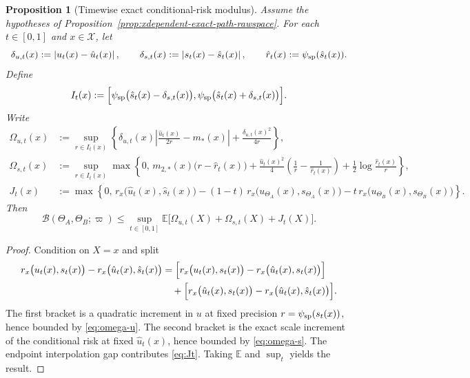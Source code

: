 \documentclass[11pt]{article}
\newtheorem{proposition}[theorem]{Proposition}
\theoremstyle{definition}
\newcommand{\E}{\mathbb{E}}
\newcommand{\abs}[1]{\left\lvert #1 \right\rvert}
\newcommand{\mc}[1]{\mathcal{#1}}
\newcommand{\cB}{\mathcal{B}}
\begin{document}
\begin{proposition}[Timewise exact conditional-risk modulus]
\label{prop:timewise-exact-condrisk-modulus}
Assume the hypotheses of Proposition~\ref{prop:xdependent-exact-path-rawspace}.
For each $t\in[0,1]$ and $x\in\mc{X}$, let
\[
  \delta_{u,t}(x):=\abs{u_t(x)-\hat u_t(x)},
  \qquad
  \delta_{s,t}(x):=\abs{s_t(x)-\hat s_t(x)},
  \qquad
  \hat r_t(x):=\psi_{\rm sp}(\hat s_t(x)).
\]
Define
\[
  I_t(x)
  :=
  \Bigl[
    \psi_{\rm sp}\bigl(\hat s_t(x)-\delta_{s,t}(x)\bigr),
    \psi_{\rm sp}\bigl(\hat s_t(x)+\delta_{s,t}(x)\bigr)
  \Bigr].
\]
Write
\begin{align}
  \Omega_{u,t}(x)
  &:=
  \sup_{r\in I_t(x)}
  \left\{
    \delta_{u,t}(x)\abs{\frac{\hat u_t(x)}{2r}-m_\ast(x)}
    +
    \frac{\delta_{u,t}(x)^2}{4r}
  \right\},
  \label{eq:omega-u}
  \\
  \Omega_{s,t}(x)
  &:=
  \sup_{r\in I_t(x)}
  \max\left\{
    0,\,
    m_{2,\ast}(x)\bigl(r-\hat r_t(x)\bigr)
    +
    \frac{\hat u_t(x)^2}{4}
    \left(
      \frac{1}{r}-\frac{1}{\hat r_t(x)}
    \right)
    +
    \frac{1}{2}\log\frac{\hat r_t(x)}{r}
  \right\},
  \label{eq:omega-s}
  \\
  J_t(x)
  &:=
  \max\left\{
    0,\,
    r_x\bigl(\hat u_t(x),\hat s_t(x)\bigr)
    -
    (1-t)\,r_x\bigl(u_{\Theta_A}(x),s_{\Theta_A}(x)\bigr)
    -
    t\,r_x\bigl(u_{\Theta_B}(x),s_{\Theta_B}(x)\bigr)
  \right\}.
  \label{eq:Jt}
\end{align}
Then
\begin{equation}
  \cB(\Theta_A,\Theta_B;\varpi)
  \le
  \sup_{t\in[0,1]}
  \E\bigl[
    \Omega_{u,t}(X)+\Omega_{s,t}(X)+J_t(X)
  \bigr].
  \label{eq:timewise-exact-condrisk-modulus}
\end{equation}
\end{proposition}

\begin{proof}
Condition on $X=x$ and split
\begin{align*}
  r_x\bigl(u_t(x),s_t(x)\bigr)-r_x\bigl(\hat u_t(x),\hat s_t(x)\bigr)
  &=
  \Bigl[
    r_x\bigl(u_t(x),s_t(x)\bigr)-r_x\bigl(\hat u_t(x),s_t(x)\bigr)
  \Bigr]
  \\
  &\quad+
  \Bigl[
    r_x\bigl(\hat u_t(x),s_t(x)\bigr)-r_x\bigl(\hat u_t(x),\hat s_t(x)\bigr)
  \Bigr].
\end{align*}
The first bracket is a quadratic increment in $u$ at fixed precision
$r=\psi_{\rm sp}(s_t(x))$, hence bounded by \eqref{eq:omega-u}. The second
bracket is the exact scale increment of the conditional risk at fixed
$\hat u_t(x)$, hence bounded by \eqref{eq:omega-s}. The endpoint interpolation
gap contributes \eqref{eq:Jt}. Taking $\E$ and $\sup_t$ yields the result.
\end{proof}
\end{document}
